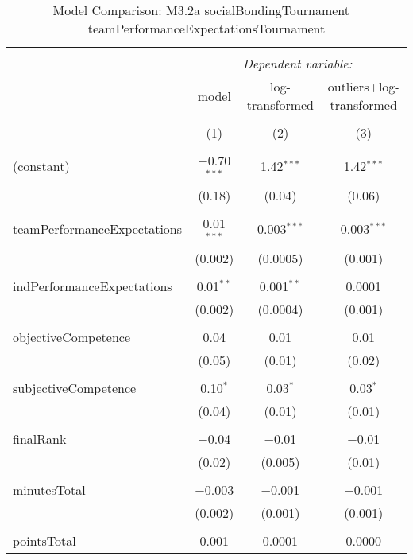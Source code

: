 
\begin{table}[!htbp] \centering 
  \caption{Model Comparison: M3.2a socialBondingTournament ~ teamPerformanceExpectationsTournament} 
  \label{tab:MLM32ateamPerfBondingTournamentModelComparison} 
\scriptsize 
\begin{tabular}{@{\extracolsep{5pt}}lccc} 
\\[-1.8ex]\hline 
\hline \\[-1.8ex] 
 & \multicolumn{3}{c}{\textit{Dependent variable:}} \\ 
\cline{2-4} 
 & model & log-transformed & outliers+log-transformed \\ 
\\[-1.8ex] & (1) & (2) & (3)\\ 
\hline \\[-1.8ex] 
 (constant) & $-$0.70$^{***}$ & 1.42$^{***}$ & 1.42$^{***}$ \\ 
  & (0.18) & (0.04) & (0.06) \\ 
  & & & \\ 
 teamPerformanceExpectations & 0.01$^{***}$ & 0.003$^{***}$ & 0.003$^{***}$ \\ 
  & (0.002) & (0.0005) & (0.001) \\ 
  & & & \\ 
 indPerformanceExpectations & 0.01$^{**}$ & 0.001$^{**}$ & 0.0001 \\ 
  & (0.002) & (0.0004) & (0.001) \\ 
  & & & \\ 
 objectiveCompetence & 0.04 & 0.01 & 0.01 \\ 
  & (0.05) & (0.01) & (0.02) \\ 
  & & & \\ 
 subjectiveCompetence & 0.10$^{*}$ & 0.03$^{*}$ & 0.03$^{*}$ \\ 
  & (0.04) & (0.01) & (0.01) \\ 
  & & & \\ 
 finalRank & $-$0.04 & $-$0.01 & $-$0.01 \\ 
  & (0.02) & (0.005) & (0.01) \\ 
  & & & \\ 
 minutesTotal & $-$0.003 & $-$0.001 & $-$0.001 \\ 
  & (0.002) & (0.001) & (0.001) \\ 
  & & & \\ 
 pointsTotal & 0.001 & 0.0001 & 0.0000 \\ 

\end{tabular}
\end{table}
